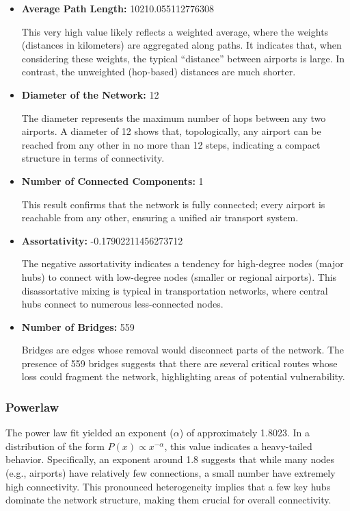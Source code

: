 \documentclass[12pt]{article}
\begin{document}
\begin{itemize}
    \item \textbf{Average Path Length:} 10210.055112776308 
    
    This very high value likely reflects a weighted average, where the weights (distances in kilometers) are aggregated along paths. It indicates that, when considering these weights, the typical “distance” between airports is large. In contrast, the unweighted (hop-based) distances are much shorter.

    \item \textbf{Diameter of the Network:} 12
    
    The diameter represents the maximum number of hops between any two airports. A diameter of 12 shows that, topologically, any airport can be reached from any other in no more than 12 steps, indicating a compact structure in terms of connectivity.

    \item \textbf{Number of Connected Components:} 1  
    
    This result confirms that the network is fully connected; every airport is reachable from any other, ensuring a unified air transport system.

    \item \textbf{Assortativity:} -0.17902211456273712  
    
    The negative assortativity indicates a tendency for high-degree nodes (major hubs) to connect with low-degree nodes (smaller or regional airports). This disassortative mixing is typical in transportation networks, where central hubs connect to numerous less-connected nodes.

    \item \textbf{Number of Bridges:} 559  
    
    Bridges are edges whose removal would disconnect parts of the network. The presence of 559 bridges suggests that there are several critical routes whose loss could fragment the network, highlighting areas of potential vulnerability.
\end{itemize}

\subsubsection{Powerlaw}
The power law fit yielded an exponent ($\alpha$) of approximately 1.8023. In a distribution of the form \( P(x) \propto x^{-\alpha} \), this value indicates a heavy-tailed behavior. Specifically, an exponent around 1.8 suggests that while many nodes (e.g., airports) have relatively few connections, a small number have extremely high connectivity. This pronounced heterogeneity implies that a few key hubs dominate the network structure, making them crucial for overall connectivity.
\end{document}
